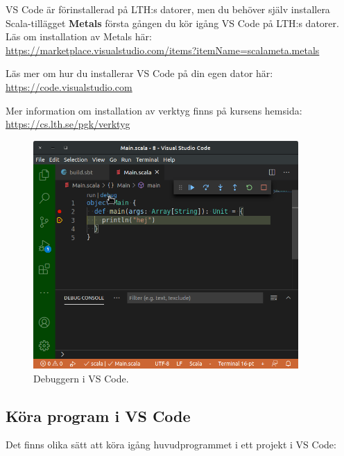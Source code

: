 VS Code är förinstallerad på LTH:s datorer, men du behöver själv installera Scala-tillägget \textbf{Metals} första gången du kör igång VS Code på LTH:s datorer. Läs om installation av Metals här: \\
\url{https://marketplace.visualstudio.com/items?itemName=scalameta.metals} 

Läs mer om hur du installerar VS Code på din egen dator här: \\\url{https://code.visualstudio.com}

Mer information om installation av verktyg finns på kursens hemsida: \\
\url{https://cs.lth.se/pgk/verktyg}

\begin{figure}
\centering
\includegraphics[width=0.9\textwidth]{../img/vscode-debug}
\caption{Debuggern i VS Code.\label{appendix-ide:vscode-debug}}
\end{figure}

\subsection{Köra program i VS Code}

Det finns olika sätt att köra igång huvudprogrammet i ett projekt i VS Code:

